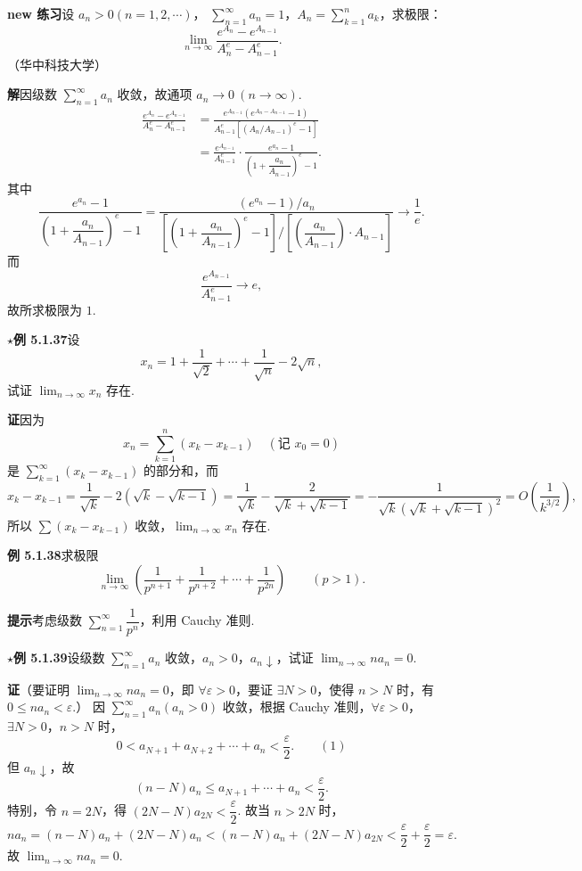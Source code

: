 \documentclass[UTF8, 12pt, fontset=fandol, oneside]{ctexart}
\begin{document}
\noindent\textbf{new 练习}\quad 设 $a_n>0(n=1,2,\cdots)$，
$\displaystyle\sum_{n=1}^{\infty}a_n=1$，$A_n=\displaystyle\sum_{k=1}^n a_k$，求极限：
\[
  \lim_{n\to\infty}\frac{e^{A_n}-e^{A_{n-1}}}{A_n^e-A_{n-1}^e}.
\]
（华中科技大学）

\noindent\textbf{解}\quad 因级数 $\displaystyle\sum_{n=1}^{\infty}a_n$ 收敛，故通项 $a_n\to0\ (n\to\infty)$.
\[
\begin{aligned}
  \frac{e^{A_n}-e^{A_{n-1}}}{A_n^e-A_{n-1}^e}
  &=\frac{e^{A_{n-1}}(e^{A_n-A_{n-1}}-1)}
          {A_{n-1}^e\left[\left(A_n/A_{n-1}\right)^e-1\right]}\\
  &=\frac{e^{A_{n-1}}}{A_{n-1}^e}\cdot
    \frac{e^{a_n}-1}{\left(1+\dfrac{a_n}{A_{n-1}}\right)^e-1}.
\end{aligned}
\]
其中
\[
  \frac{e^{a_n}-1}{\left(1+\dfrac{a_n}{A_{n-1}}\right)^e-1}
  =
  \frac{(e^{a_n}-1)/a_n}
       {\left[\left(1+\dfrac{a_n}{A_{n-1}}\right)^e-1\right]/
        \left[\left(\dfrac{a_n}{A_{n-1}}\right)\cdot A_{n-1}\right]}
  \to\frac1e.
\]
而
\[
  \frac{e^{A_{n-1}}}{A_{n-1}^e}\to e,
\]
故所求极限为 $1$.

\noindent\textbf{$\star$例 5.1.37}\quad 设
\[
  x_n=1+\frac1{\sqrt2}+\cdots+\frac1{\sqrt n}-2\sqrt n,
\]
试证 $\displaystyle\lim_{n\to\infty}x_n$ 存在.

\noindent\textbf{证}\quad 因为
\[
  x_n=\sum_{k=1}^n(x_k-x_{k-1})\quad(\text{记 }x_0=0)
\]
是 $\displaystyle\sum_{k=1}^{\infty}(x_k-x_{k-1})$ 的部分和，而
\[
  x_k-x_{k-1}=\frac1{\sqrt k}-2(\sqrt k-\sqrt{k-1})
  =\frac1{\sqrt k}-\frac2{\sqrt k+\sqrt{k-1}}
  =-\frac1{\sqrt k(\sqrt k+\sqrt{k-1})^2}
  =O\left(\frac1{k^{3/2}}\right),
\]
所以 $\displaystyle\sum(x_k-x_{k-1})$ 收敛，$\displaystyle\lim_{n\to\infty}x_n$ 存在.

\noindent\textbf{例 5.1.38}\quad 求极限
\[
  \lim_{n\to\infty}\left(\frac1{p^{n+1}}+\frac1{p^{n+2}}+\cdots+\frac1{p^{2n}}\right)
  \qquad(p>1).
\]

\noindent\textbf{提示}\quad 考虑级数 $\displaystyle\sum_{n=1}^{\infty}\dfrac1{p^n}$，利用 Cauchy 准则.

\noindent\textbf{$\star$例 5.1.39}\quad 设级数 $\displaystyle\sum_{n=1}^{\infty}a_n$ 收敛，$a_n>0$，$a_n\downarrow$，试证
$\displaystyle\lim_{n\to\infty}na_n=0$.

\noindent\textbf{证}\quad （要证明 $\lim_{n\to\infty}na_n=0$，即 $\forall\varepsilon>0$，要证 $\exists N>0$，使得 $n>N$ 时，有 $0\le na_n<\varepsilon$.）
因 $\displaystyle\sum_{n=1}^{\infty}a_n(a_n>0)$ 收敛，根据 Cauchy 准则，$\forall\varepsilon>0$，$\exists N>0$，$n>N$ 时，
\[
  0<a_{N+1}+a_{N+2}+\cdots+a_n<\frac{\varepsilon}{2}.
\qquad(1)
\]
但 $a_n\downarrow$，故
\[
  (n-N)a_n\le a_{N+1}+\cdots+a_n<\frac{\varepsilon}{2}.
\]
特别，令 $n=2N$，得 $(2N-N)a_{2N}<\dfrac{\varepsilon}{2}$. 故当 $n>2N$ 时，
\[
  na_n=(n-N)a_n+(2N-N)a_n
  <(n-N)a_n+(2N-N)a_{2N}<\frac{\varepsilon}{2}+\frac{\varepsilon}{2}
  =\varepsilon.
\]
故 $\displaystyle\lim_{n\to\infty}na_n=0$.
\end{document}
